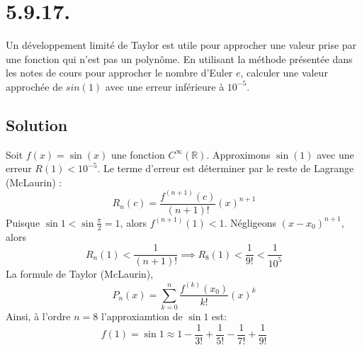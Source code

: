 \section*{5.9.17.}
	Un développement limité de Taylor est utile pour approcher une valeur prise par une fonction qui n'est pas un polynôme. En utilisant la méthode présentée dans les notes de cours pour approcher le nombre d'Euler $e$, calculer une valeur approchée de $sin(1)$ avec une erreur inférieure à $10^{-5}$.
\subsection*{Solution}
	Soit $f(x)=\sin(x)$ une fonction $C^{\infty}(\mathbb{R})$. Approximons $\sin(1)$ avec une erreur $R(1)<10^{-5}$.
	Le terme d'erreur est déterminer par le reste de Lagrange (McLaurin) :\[R_n(c)=\frac{f^{(n+1)}(c)}{(n+1)!}(x)^{n+1}\]
	Puisque $\sin 1 < \sin \frac{\pi}{2}=1$, alors $f^{(n+1)}(1)<1$. Négligeons $(x-x_0)^{n+1}$, alors \[R_n(1)<\frac{1}{(n+1)!}\implies R_8(1)<\frac{1}{9!}<\frac{1}{10^5}\]
	La formule de Taylor (McLaurin), \[P_n(x)=\sum_{k=0}^{n}\frac{f^{(k)}(x_0)}{k!}(x)^k\]
	Ainsi, à l'ordre $n=8$ l'approxiamtion de $\sin 1$ est:
	\[f(1)=\sin 1 \approx {1} - \frac{1}{3!} + \frac{1}{5!}-\frac{1}{7!} +\frac{1}{9!}\]